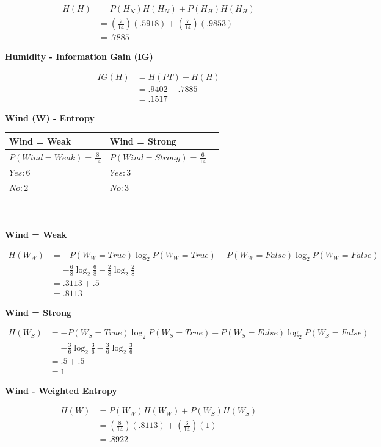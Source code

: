 \documentclass[11pt]{article}
\begin{document}
\begin{enumerate}
\[
\begin{aligned}
H(H)&= P(H_N)H(H_N)+P(H_H)H(H_H)\\[5pt]
&= (\frac{7}{14})(.5918)+(\frac{7}{14})(.9853)\\[5pt]
&= .7885
\end{aligned}
\]

\textbf{Humidity - Information Gain (IG)}

\[
\begin{aligned}
IG(H)&= H(PT) - H(H)\\[5pt]
&= .9402 - .7885\\[5pt]
&= .1517
\end{aligned}
\]

\textbf{Wind (W) - Entropy}

\begin{tabular}{l|l|l}
    \textbf{Wind = Weak} & \textbf{Wind = Strong} \\
    \hline
    $P(Wind = Weak) = \frac{8}{14}$ & $P(Wind = Strong) = \frac{6}{14}$ \\
    $Yes: 6$ & $Yes: 3$ \\
    $No: 2$ & $No: 3$\\
\end{tabular}\\\\

\textbf{Wind = Weak}

\[
\begin{aligned}
H(W_W)&= -P(W_W=True) \log_2 P(W_W=True)-P(W_W=False) \log_2 P(W_W=False)\\[5pt]
&= -\frac{6}{8}\log_2\frac{6}{8}-\frac{2}{8}\log_2\frac{2}{8}\\[5pt]
&= .3113 + .5\\[5pt]
&= .8113
\end{aligned}
\]

\textbf{Wind = Strong}

\[
\begin{aligned}
H(W_S)&= -P(W_S=True) \log_2 P(W_S=True)-P(W_S=False) \log_2 P(W_S=False)\\[5pt]
&= -\frac{3}{6}\log_2\frac{3}{6}-\frac{3}{6}\log_2\frac{3}{6}\\[5pt]
&= .5 + .5\\[5pt]
&= 1
\end{aligned}
\]

\textbf{Wind - Weighted Entropy}

\[
\begin{aligned}
H(W)&= P(W_W)H(W_W)+P(W_S)H(W_S)\\[5pt]
&= (\frac{8}{14})(.8113)+(\frac{6}{14})(1)\\[5pt]
&= .8922
\end{aligned}
\]


\end{enumerate}
\end{document}
